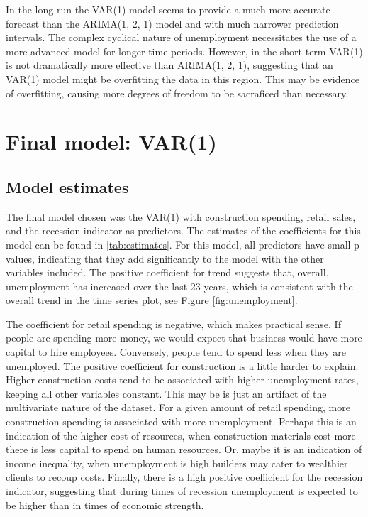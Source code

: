 \documentclass[twoside,twocolumn]{article}
\begin{document}
In the long run the VAR(1) model seems to provide a much more accurate forecast than the ARIMA(1, 2, 1) model and with much narrower prediction intervals. The complex cyclical nature of unemployment necessitates the use of a more advanced model for longer time periods. However, in the short term VAR(1) is not dramatically more effective than ARIMA(1, 2, 1), suggesting that an VAR(1) model might be overfitting the data in this region. This may be evidence of overfitting, causing more degrees of freedom to be sacraficed than necessary.


 \section{Final model: VAR(1)}

 \subsection{Model estimates} \label{estimates}

The final model chosen was the VAR(1) with construction spending, retail sales, and the recession indicator as predictors.
 The estimates of the coefficients for this model can be found in \ref{tab:estimates}. For this model, all predictors have small p-values, indicating that they add significantly to the model with the other variables included. The positive coefficient for trend suggests that, overall, unemployment has increased over the last 23 years, which is consistent with the overall trend in the time series plot, see Figure \ref{fig:unemployment}. 
 

The coefficient for retail spending is negative, which makes practical sense. If people are spending more money, we would expect that business would have more capital to hire employees. Conversely, people tend to spend less when they are unemployed.  The positive coefficient for construction is a little harder to explain. Higher construction costs tend to be associated with higher unemployment rates, keeping all other variables constant.  This may be is just an artifact of the multivariate nature of the dataset. For a given amount of retail spending, more construction spending is associated with more unemployment. Perhaps this is an indication of the higher cost of resources, when construction materials cost more there is less capital to spend on human resources. Or, maybe it is an indication of income inequality, when unemployment is high builders may cater to wealthier clients to recoup costs. Finally, there is a high positive coefficient for the recession indicator, suggesting that during times of recession unemployment is expected to be higher than in times of economic strength.
 
\end{document}

